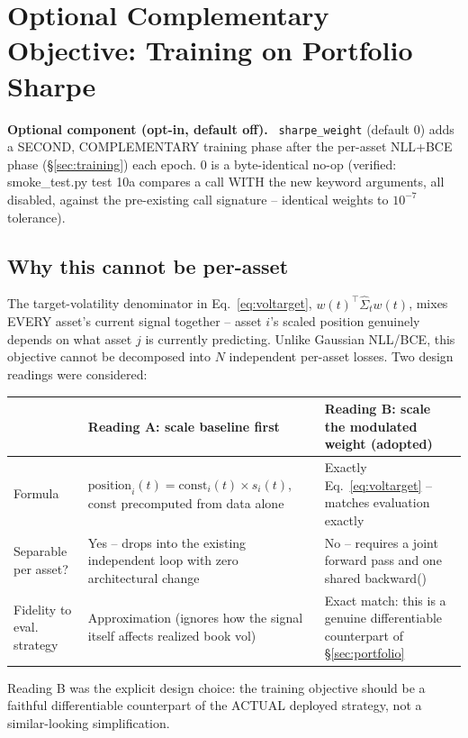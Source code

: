 \documentclass[11pt]{article}
\newcommand{\code}[1]{\texttt{\small #1}}
\newcommand{\optionallabel}{\small\textbf{Optional component (opt-in, default off).}~}
\begin{document}
\section{Optional Complementary Objective: Training on Portfolio Sharpe}
\label{sec:sharpeobjective}

\begin{optional}\optionallabel
\code{sharpe\_weight} (default $0$) adds a SECOND, COMPLEMENTARY training phase after the
per-asset NLL+BCE phase (\S\ref{sec:training}) each epoch. $0$ is a byte-identical no-op
(verified: smoke\_test.py test 10a compares a call WITH the new keyword arguments, all
disabled, against the pre-existing call signature -- identical weights to $10^{-7}$
tolerance).
\end{optional}

\subsection{Why this cannot be per-asset}

The target-volatility denominator in Eq.~\ref{eq:voltarget}, $w(t)^\top \hat\Sigma_t w(t)$,
mixes EVERY asset's current signal together -- asset $i$'s scaled position genuinely depends
on what asset $j$ is currently predicting. Unlike Gaussian NLL/BCE, this objective cannot be
decomposed into $N$ independent per-asset losses. Two design readings were considered:

\begin{center}
\renewcommand{\arraystretch}{1.3}
\begin{tabular}{@{}p{3.6cm}p{5.6cm}p{5.6cm}@{}}
\toprule
 & \textbf{Reading A: scale baseline first} & \textbf{Reading B: scale the modulated weight (adopted)} \\
\midrule
Formula & $\text{position}_i(t) = \text{const}_i(t) \times s_i(t)$, const precomputed from data alone & Exactly Eq.~\ref{eq:voltarget} -- matches evaluation exactly \\
Separable per asset? & Yes -- drops into the existing independent loop with zero architectural change & No -- requires a joint forward pass and one shared backward() \\
Fidelity to eval. strategy & Approximation (ignores how the signal itself affects realized book vol) & Exact match: this is a genuine differentiable counterpart of \S\ref{sec:portfolio} \\
\bottomrule
\end{tabular}
\end{center}
Reading B was the explicit design choice: the training objective should be a faithful
differentiable counterpart of the ACTUAL deployed strategy, not a similar-looking
simplification.
\end{document}
